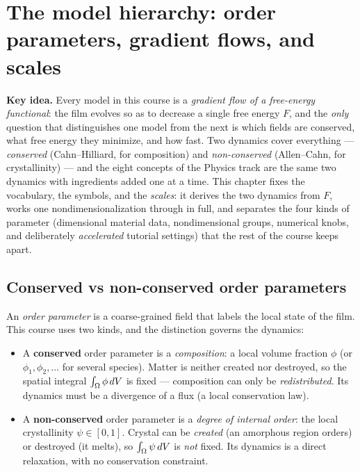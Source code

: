 \chapter{The model hierarchy: order parameters, gradient flows, and scales}
\label{ch:p0}

\begin{keybox}
\textbf{Key idea.} Every model in this course is a \emph{gradient flow of a
free-energy functional}: the film evolves so as to decrease a single free
energy $F$, and the \emph{only} question that distinguishes one model from
the next is which fields are conserved, what free energy they minimize, and
how fast. Two dynamics cover everything --- \emph{conserved}
(Cahn--Hilliard, for composition) and \emph{non-conserved} (Allen--Cahn,
for crystallinity) --- and the eight concepts of the Physics track are the
same two dynamics with ingredients added one at a time. This chapter fixes
the vocabulary, the symbols, and the \emph{scales}: it derives the two
dynamics from $F$, works one nondimensionalization through in full, and
separates the four kinds of parameter (dimensional material data,
nondimensional groups, numerical knobs, and deliberately \emph{accelerated}
tutorial settings) that the rest of the course keeps apart.
\end{keybox}

\section{Conserved vs non-conserved order parameters}

An \emph{order parameter} is a coarse-grained field that labels the local
state of the film. This course uses two kinds, and the distinction governs
the dynamics:
\begin{itemize}[nosep]
  \item A \textbf{conserved} order parameter is a \emph{composition}: a
        local volume fraction $\phi$ (or $\phi_1,\phi_2,\dots$ for several
        species). Matter is neither created nor destroyed, so the spatial
        integral $\int_\Omega\phi\,dV$ is fixed --- composition can only be
        \emph{redistributed}. Its dynamics must be a divergence of a flux
        (a local conservation law).
  \item A \textbf{non-conserved} order parameter is a \emph{degree of
        internal order}: the local crystallinity $\psi\in[0,1]$. Crystal
        can be \emph{created} (an amorphous region orders) or destroyed (it
        melts), so $\int_\Omega\psi\,dV$ is \emph{not} fixed. Its dynamics is a
        direct relaxation, with no conservation constraint.
\end{itemize}


